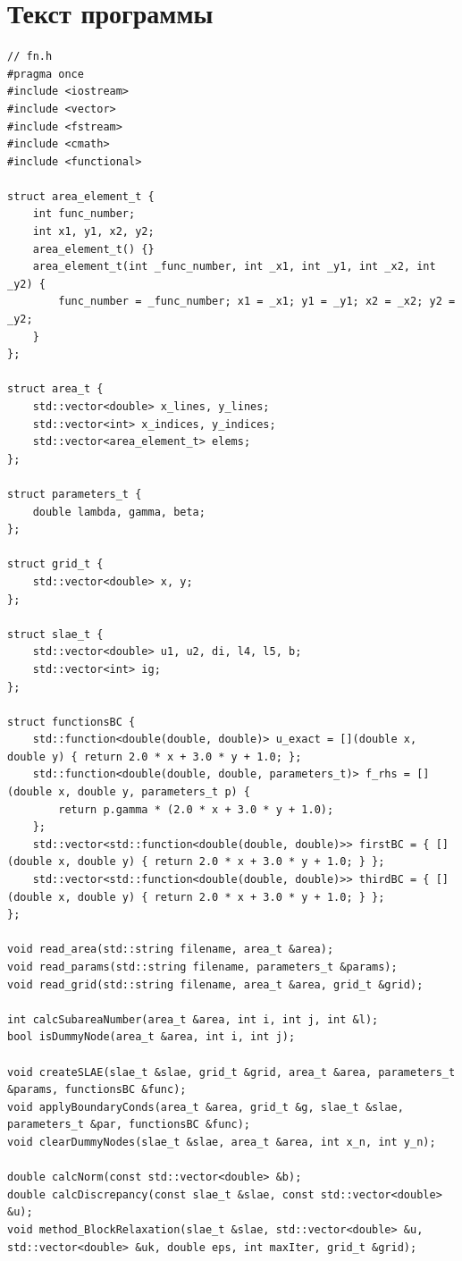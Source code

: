 \documentclass[a4paper,12pt]{article}
\begin{document}
\section{Текст программы}

\begin{lstlisting}
// fn.h
#pragma once
#include <iostream>
#include <vector>
#include <fstream>
#include <cmath>
#include <functional>

struct area_element_t {
    int func_number;
    int x1, y1, x2, y2;
    area_element_t() {}
    area_element_t(int _func_number, int _x1, int _y1, int _x2, int _y2) {
        func_number = _func_number; x1 = _x1; y1 = _y1; x2 = _x2; y2 = _y2;
    }
};

struct area_t {
    std::vector<double> x_lines, y_lines;
    std::vector<int> x_indices, y_indices;
    std::vector<area_element_t> elems;
};

struct parameters_t {
    double lambda, gamma, beta; 
};

struct grid_t {
    std::vector<double> x, y;
};

struct slae_t {
    std::vector<double> u1, u2, di, l4, l5, b;
    std::vector<int> ig;
};

struct functionsBC {
    std::function<double(double, double)> u_exact = [](double x, double y) { return 2.0 * x + 3.0 * y + 1.0; };
    std::function<double(double, double, parameters_t)> f_rhs = [](double x, double y, parameters_t p) { 
        return p.gamma * (2.0 * x + 3.0 * y + 1.0); 
    };
    std::vector<std::function<double(double, double)>> firstBC = { [](double x, double y) { return 2.0 * x + 3.0 * y + 1.0; } };
    std::vector<std::function<double(double, double)>> thirdBC = { [](double x, double y) { return 2.0 * x + 3.0 * y + 1.0; } };
};

void read_area(std::string filename, area_t &area);
void read_params(std::string filename, parameters_t &params);
void read_grid(std::string filename, area_t &area, grid_t &grid);

int calcSubareaNumber(area_t &area, int i, int j, int &l);
bool isDummyNode(area_t &area, int i, int j);

void createSLAE(slae_t &slae, grid_t &grid, area_t &area, parameters_t &params, functionsBC &func);
void applyBoundaryConds(area_t &area, grid_t &g, slae_t &slae, parameters_t &par, functionsBC &func);
void clearDummyNodes(slae_t &slae, area_t &area, int x_n, int y_n);

double calcNorm(const std::vector<double> &b);
double calcDiscrepancy(const slae_t &slae, const std::vector<double> &u);
void method_BlockRelaxation(slae_t &slae, std::vector<double> &u, std::vector<double> &uk, double eps, int maxIter, grid_t &grid);


\end{lstlisting}
\end{document}
